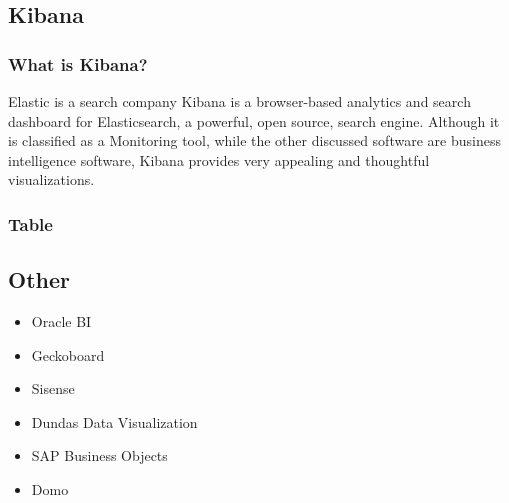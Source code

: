         \subsection{Kibana}
        \subsubsection{What is Kibana?} 
        Elastic is a search company 
        Kibana is a browser-based analytics and search dashboard for Elasticsearch, a powerful, open source, search engine. Although it is classified as a Monitoring tool, while the other discussed software are business intelligence software, Kibana provides very appealing and thoughtful visualizations.
        \subsubsection{Table}
        
        \subsection{Other}
        \begin{itemize}
            \setlength\itemsep{-0.5em}                                    
            \item{Oracle BI}
            \item{Geckoboard}
            \item{Sisense}
            \item{Dundas Data Visualization}
            \item{SAP Business Objects}
            \item{Domo}
        \end{itemize}
   